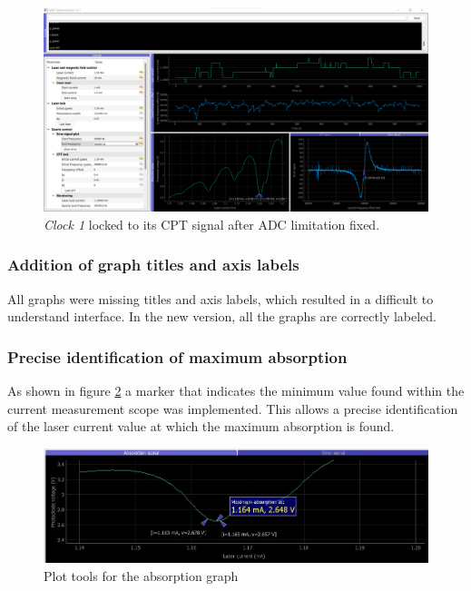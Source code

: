 \documentclass[a4paper,12pt]{article}
\begin{document}
\begin{figure}[!h]
    \centering
    \includegraphics[width=\textwidth]{Images/CPT_lock_after_FSR_fix.png}
    \captionsetup{justification=centering}
    \caption{\textit{Clock 1} locked to its CPT signal after ADC limitation fixed.} 
    \label{fig:ADC_fix_check_CPT_lock}
\end{figure}

%
\newpage
\subsubsection{Addition of graph titles and axis labels}
\label{section:graphs}

All graphs were missing titles and axis labels, which resulted in a difficult to understand interface. In the new version, all the graphs are correctly labeled.

\subsubsection{Precise identification of maximum absorption}
\label{section:max_absorb}
 As shown in figure \ref{fig:plot_tools_1} a marker that indicates the minimum value found within the current measurement scope was implemented. This allows a precise identification of the laser current value at which the maximum absorption is found. 

\begin{figure}[!h]
\centering
\includegraphics[width=\textwidth]{Images/plot_tools_1.png}
\captionsetup{justification=centering}
\caption{Plot tools for the absorption graph} 
\label{fig:plot_tools_1}
\end{figure}
\end{document}
